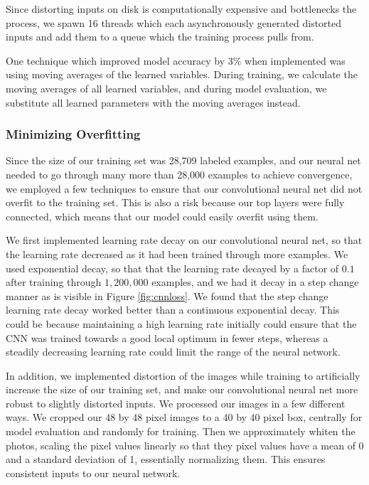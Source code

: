 \documentclass[10pt, twocolumn, twoside]{article}
\begin{document}
Since distorting inputs on disk is computationally expensive and bottlenecks the process, we spawn 16 threads which each asynchronously generated distorted inputs and add them to a queue which the training process pulls from.

One technique which improved model accuracy by $3\%$ when implemented was using moving averages of the learned variables. During training, we calculate the moving averages of all learned variables, and during model evaluation, we substitute all learned parameters with the moving averages instead.


\subsubsection{Minimizing Overfitting} \label{overfitting}

Since the size of our training set was 28,709 labeled examples, and our neural net needed to go through many more than 28,000 examples to achieve convergence, we employed a few techniques to ensure that our convolutional neural net did not overfit to the training set. This is also a risk because our top layers were fully connected, which means that our model could easily overfit using them.

We first implemented learning rate decay on our convolutional neural net, so that the learning rate decreased as it had been trained through more examples. We used exponential decay, so that that the learning rate decayed by a factor of $0.1$ after training through $1,200,000$ examples, and we had it decay in a step change manner as is visible in Figure \ref{fig:cnnloss}. We found that the step change learning rate decay worked better than a continuous exponential decay. This could be because maintaining a high learning rate initially could ensure that the CNN was trained towards a good local optimum in fewer steps, whereas a steadily decreasing learning rate could limit the range of the neural network.

In addition, we implemented distortion of the images while training to artificially increase the size of our training set, and make our convolutional neural net more robust to slightly distorted inputs. We processed our images in a few different ways. We cropped our 48 by 48 pixel images to a 40 by 40 pixel box, centrally for model evaluation and randomly for training. Then we approximately whiten the photos, scaling the pixel values linearly so that they pixel values have a mean of 0 and a standard deviation of 1, essentially normalizing them. This ensures consistent inputs to our neural network.
\end{document}
